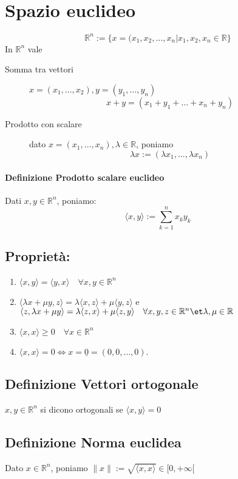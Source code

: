 \documentclass[a4paper]{article}
\newcommand {\R}{\mathbb{R}}
\begin{document}
\section{Spazio euclideo}
$$
\R ^ n := \{ x = (x_1, x_2, \dots , x_n | x_1, x_2, x_n \in \R \}
$$	
In $ \R ^ n $ vale 

\begin{description}
	\item [Somma tra vettori] $ x = (x_1,\dots,x_2) , y = (y_1, ... , y_n) $
		$$
		x+y=(x_1+y_1 + \dots + x_n + y_n )
		$$
	\item [Prodotto  con scalare] dato $ x=(x_1, \dots , x_n) , \lambda \in \R $, poniamo
		$$
		\lambda x:=( \lambda x_1, \dots , \lambda x_n )
		$$
\end{description}

\paragraph{Definizione Prodotto scalare euclideo} Dati $x , y \in \R ^ n $, poniamo:
$$
\langle x,y \rangle := \sum_{k=1}^n x_k y_k
$$

\subsection{ Proprietà: }

\begin{enumerate}
	\item %
		$\langle x,y \rangle = \langle y,x \rangle \quad \forall x,y \in \R ^n $ 

	\item %
		$ \langle \lambda x + \mu y , z \rangle = \lambda \langle x ,z \rangle + \mu \langle y,z \rangle $ e
		$ \langle z, \lambda x + \mu y \rangle = \lambda \langle z,x \rangle + \mu \langle z,y \rangle \quad \forall x,y,z \in \R ^ n \et \lambda , \mu \in \R $
		\item $ \langle x,x \rangle \ge 0 \quad \forall x \in \R ^ n $
		\item $ \langle x,x \rangle = 0 \iff x= \underline{0} = (0,0,\dots, 0). $
\end{enumerate}

\subsection { Definizione Vettori ortogonale} $x,y \in \R ^n $ si dicono ortogonali se $ \langle x,y \rangle = 0$

\subsection { Definizione Norma euclidea }
Dato $ x \in \R ^n $, poniamo $ \|x \| := \sqrt{\langle x,x \rangle } \in [0, + \infty [$
\end{document}
